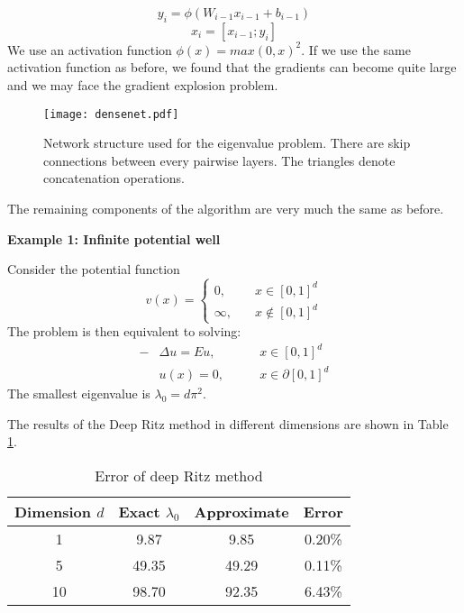 \documentclass[a4paper,12pt]{article}
\begin{document}


\begin{equation}
y_i=\phi(W_{i-1}x_{i-1}+b_{i-1})
\end{equation}
\begin{equation}
x_i=[x_{i-1};y_i]
\end{equation}
We use an activation function $\phi(x)=max(0,x)^2$.
If we use the same activation function as before, we found that the gradients
can become quite large and we may face the gradient explosion problem.


\begin{figure}[!h]
\centering
\vspace{2pt}
\texttt{[image: densenet.pdf]}
\caption{Network structure used for the eigenvalue problem.
There are skip connections between every pairwise layers. 
The triangles denote concatenation operations.\label{fig:net_structure_2}}
\end{figure}

The remaining components of the algorithm are very much the same as before.

\vspace{.1in}
\noindent
{\bf Example 1: Infinite potential well}

Consider the potential function
\begin{equation}
v(x)=\left\{
\begin{aligned}
0, &  \quad x \in [0,1]^d \\
\infty , & \quad x \notin [0,1]^d
\end{aligned}
\right.
\end{equation}
The problem is then equivalent to solving:
\begin{equation}
\begin{aligned}
-&\Delta u=Eu,\quad &x \in [0,1]^d\\
&u(x)=0, \qquad &x \in \partial [0,1]^d
\end{aligned}
\end{equation}
The smallest eigenvalue is $\lambda_0=d\pi ^2$.

The results of the Deep Ritz method in different 
dimensions are shown in Table \ref{tab:ipw}.

\begin{table}[!h]
\caption{Error of deep Ritz method}\label{tab:ipw}
\begin{center}
\begin{tabular}{c|c|c|c}
\hline
Dimension $d$ & Exact $\lambda_0$ & Approximate & Error \\ \hline
1 & 9.87 & 9.85  &  0.20\% \\ \hline
5 & 49.35 & 49.29 &  0.11\% \\ \hline
10 & 98.70 & 92.35 & 6.43\% \\ \hline
\end{tabular}
\end{center}
\end{table}
\end{document}
